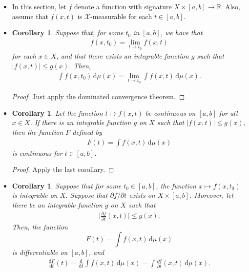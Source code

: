\documentclass[10pt]{article}
\newtheorem{corollary}[lemma]{Corollary}
\newcommand{\dee}{\mathrm{d}}
\newcommand{\mcal}[1]{\mathcal{#1}}
\newcommand{\Real}{\mathbb{R}}
\begin{document}
\begin{itemize}
  \item In this section, let $f$ denote a function with signature $X \times [a,b] \rightarrow \Real$. Also, assume that $f(x,t)$ is $\mcal{X}$-measurable for each $t \in [a,b]$.
  
  \item \begin{corollary}
    Suppose that, for some $t_0$ in $[a,b]$, we have that
    \begin{align*}
      f(x,t_0) = \lim_{t \rightarrow t_0} f(x,t)
    \end{align*}
    for each $x \in X$, and that there exists an integrable function $g$ such that $|f(x,t)| \leq g(x)$. Then,
    \begin{align*}
      \int f(x,t_0)\, \dee\mu(x) = \lim_{t \rightarrow t_0} \int f(x,t)\, \dee\mu(x).
    \end{align*}
  \end{corollary}

  \begin{proof}
    Just apply the dominated convergence theorem.
  \end{proof}

  \item \begin{corollary}
    Let the function $t \mapsto f(x,t)$ be continuous on $[a,b]$ for all $x \in X$. If there is an integrable function $g$ on $X$ such that $|f(x,t)| \leq g(x)$, then the function $F$ defined by
    \begin{align*}
      F(t) = \int f(x,t)\, \dee\mu(x)
    \end{align*}
    is continuous for $t \in [a,b]$.
  \end{corollary}

  \begin{proof}
    Apply the last corollary.
  \end{proof}
  
  \item \begin{corollary}
    Suppose that for some $t_0 \in [a,b]$, the function $x \mapsto f(x,t_0)$ is integrable on $X$. Suppose that $\partial f / \partial t$ exists on $X \times [a,b]$. Moreover, let there be an integrable function $g$ on $X$ such that
    \begin{align*}
      \bigg| \frac{\partial f}{\partial t}(x,t) \bigg| \leq g(x).
    \end{align*}
    Then, the function $$F(t) = \int f(x,t)\, \dee\mu(x)$$ is differentiable on $[a,b]$, and
    \begin{align*}
      \frac{\dee F}{\dee t} (t) = \frac{\dee}{\dee t} \int f(x,t)\, \dee\mu(x) = \int \frac{\partial f}{\partial t}(x,t)\, \dee\mu(x).
    \end{align*}
  \end{corollary}


\end{itemize}
\end{document}
